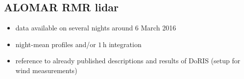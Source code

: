 \subsection{ALOMAR RMR lidar}

\begin{itemize}
  \item data available on several nights around 6 March 2016
  \item night-mean profiles and/or $1$\,h integration
  \medskip
  \item reference to already published descriptions and results of DoRIS (setup for wind measurements)
\end{itemize}